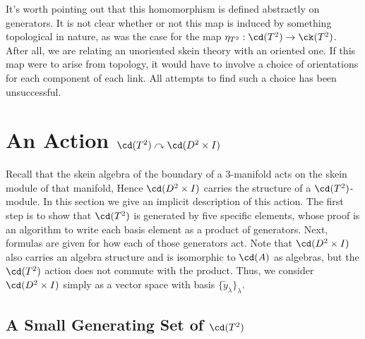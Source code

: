 \begin{remark}
It's worth pointing out that this homomorphism is defined abstractly on generators. It is not clear whether or not this map is induced by something topological in nature, as was the case for the map $\eta_{T^2}: \cd(T^2) \to \ck(T^2)$. After all, we are relating an unoriented skein theory with an oriented one. If this map were to arise from topology, it would have to involve a choice of orientations for each component of each link. All attempts to find such a choice has been unsuccessful.
\end{remark}


\section{An Action $\cd(T^2) \curvearrowright \cd(D^2 \times I)$}


Recall that the skein algebra of the boundary of a 3-manifold acts on the skein module of that manifold, Hence $\cd(D^2 \times I)$ carries the structure of a $\cd(T^2)$-module. In this section we give an implicit description of this action. The first step is to show that $\cd(T^2)$ is generated by five specific elements, whose proof is an algorithm to write each basis element as a product of generators. Next, formulas are given for how each of those generators act. Note that $\cd(D^2 \times I)$ also carries an algebra structure and is isomorphic to $\cd(A)$ as algebras, but the $\cd(T^2)$ action does not commute with the product. Thus, we consider $\cd(D^2 \times I)$ simply as a vector space with basis $\{\tilde{y}_\lambda \}_\lambda$.






\subsection{A Small Generating Set of $\cd(T^2)$} \label{sec:generators}

